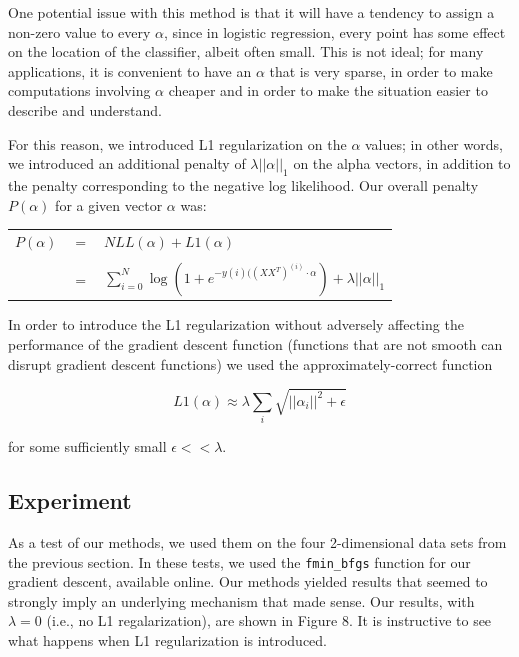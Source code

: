 \documentclass{sigchi}
\begin{document}

One potential issue with this method is that it will have a tendency to assign a non-zero value to every $\alpha$, since in logistic regression, every point has some effect on the location of the classifier, albeit often small. This is not ideal; for many applications, it is convenient to have an $\alpha$ that is very sparse, in order to make computations involving $\alpha$ cheaper and in order to make the situation easier to describe and understand. 

For this reason, we introduced L1 regularization on the $\alpha$ values; in other words, we introduced an additional penalty of $\lambda ||\alpha||_1$ on the alpha vectors, in addition to the penalty corresponding to the negative log likelihood. Our overall penalty $P(\alpha)$ for a given vector $\alpha$ was: 

\begin{center}
\begin{tabular}{r c l}
$P(\alpha)$&$=$&$\displaystyle NLL(\alpha) + L1(\alpha)$\\
&&\\
&$=$&$\displaystyle \sum_{i=0}^N \log(1+e^{-y{(i)}((XX^T)^{(i)} \cdot \alpha}) + \lambda||\alpha||_1$\\
\end{tabular}
\end{center}

In order to introduce the L1 regularization without adversely affecting the performance of the gradient descent function (functions that are not smooth can disrupt gradient descent functions) we used the approximately-correct function 

$$L1(\alpha) \approx \lambda \sum_i \sqrt{||\alpha_i||^2 + \epsilon}$$

for some sufficiently small $\epsilon << \lambda$. 

\subsection{Experiment}

As a test of our methods, we used them on the four 2-dimensional data sets from the previous section. In these tests, we used the \texttt{fmin\_bfgs} function for our gradient descent, available online. Our methods yielded results that seemed to strongly imply an underlying mechanism that made sense. Our results, with $\lambda = 0$ (i.e., no L1 regalarization), are shown in Figure 8. It is instructive to see what happens when L1 regularization is introduced.
\end{document}
